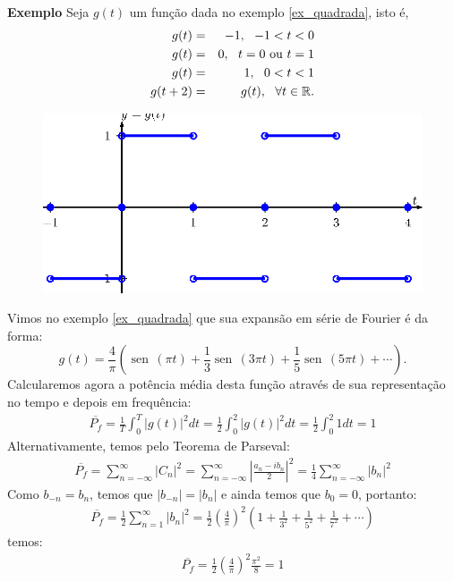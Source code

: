 \documentclass[a4paper,10pt]{book}
\newcommand{\sen}{\operatorname{sen}\,}
\begin{document}
 
 {\bf Exemplo}
Seja $g(t)$ um função dada no exemplo \ref{ex_quadrada}, isto é,
 \begin{eqnarray*}
 g(t)&=&-1, \ \ -1< t<0\\
 g(t)&=&0, \ \ t=0\ \hbox{ou}\ t=1\\
 g(t)&=&1, \ \ 0< t<1\\
 g(t+2)&=&g(t),\ \ \forall t\in\mathbb{R}.
 \end{eqnarray*}
 \begin{figure}[!ht]
 \begin{center}
 \includegraphics{figs/cap_propriedades_series_figura_1}\end{center}
 \end{figure}
 Vimos no exemplo \ref{ex_quadrada} que sua expansão em série de Fourier é da forma:
 \begin{equation}
 g(t)=\frac{4}{\pi}\left(\sen(\pi t)+\frac{1}{3}\sen(3\pi t)+\frac{1}{5}\sen(5\pi t)+\cdots\right).
 \end{equation}
 Calcularemos agora a potência média desta função através de sua representação no tempo e depois em frequência:
 \begin{eqnarray*}
  \overline{P_f}=\frac{1}{T}\int_0^T |g(t)|^2dt=\frac{1}{2}\int_0^2 |g(t)|^2dt=\frac{1}{2}\int_0^2 1dt=1
 \end{eqnarray*}
 Alternativamente, temos pelo Teorema de Parseval:
 \begin{eqnarray*}
  \overline{P_f}=\sum_{n=-\infty}^\infty |C_n|^2=\sum_{n=-\infty}^\infty \left|\frac{a_n-ib_n}{2}\right|^2=\frac{1}{4}\sum_{n=-\infty}^\infty |b_n|^2
 \end{eqnarray*}
 Como $b_{-n}=b_n$, temos que $|b_{-n}|=|b_n|$ e ainda temos que $b_0=0$, portanto: 
 \begin{eqnarray*}
  \overline{P_f}=\frac{1}{2}\sum_{n=1}^\infty |b_n|^2 = \frac{1}{2}\left(\frac{4}{\pi}\right)^2\left(1 + \frac{1}{3^2}+ \frac{1}{5^2}+ \frac{1}{7^2}+\cdots\right)
 \end{eqnarray*}
 temos:
 \begin{eqnarray*}
  \overline{P_f}=\frac{1}{2}\left(\frac{4}{\pi}\right)^2\frac{\pi^2}{8}=1
 \end{eqnarray*}
\end{document}
